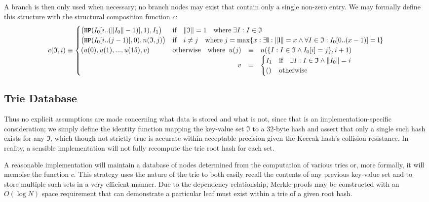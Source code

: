\documentclass[9pt,oneside]{amsart}
\begin{document}
A branch is then only used when necessary; no branch nodes may exist that contain only a single non-zero entry. We may formally define this structure with the structural composition function $c$:
\begin{equation}
c(\mathfrak{I}, i) \equiv \begin{cases}
 \big(\texttt{HP}(I_0[i .. (\lVert I_0\rVert - 1)], 1), I_1 \big) & \text{if} \quad \lVert \mathfrak{I} \rVert = 1 \quad \text{where} \; \exists I: I \in \mathfrak{I} \\
\big(\texttt{HP}(I_0[i .. (j - 1)], 0), n(\mathfrak{I}, j) \big) & \text{if} \quad i \ne j \quad \text{where} \; j = \max \{ x : \exists \mathbf{l}: \lVert \mathbf{l} \rVert = x \wedge \forall I \in \mathfrak{I}: I_0[0 .. (x - 1)] = \mathbf{l} \} \\
(u(0), u(1), ..., u(15), v) & \text{otherwise} \quad \text{where} \begin{array}[t]{rcl}
u(j) & \equiv & n(\{ I : I \in \mathfrak{I} \wedge I_0[i] = j \}, i + 1) \\
v & = & \begin{cases}
I_1 & \text{if} \quad \exists I: I \in \mathfrak{I} \wedge \lVert I_0 \rVert = i \\
() & \text{otherwise}
\end{cases}
\end{array}
\end{cases}
\end{equation}

\subsection{Trie Database}
Thus no explicit assumptions are made concerning what data is stored and what is not, since that is an implementation-specific consideration; we simply define the identity function mapping the key-value set $\mathfrak{I}$ to a 32-byte hash and assert that only a single such hash exists for any $\mathfrak{I}$, which though not strictly true is accurate within acceptable precision given the Keccak hash's collision resistance. In reality, a sensible implementation will not fully recompute the trie root hash for each set.

A reasonable implementation will maintain a database of nodes determined from the computation of various tries or, more formally, it will memoise the function $c$. This strategy uses the nature of the trie to both easily recall the contents of any previous key-value set and to store multiple such sets in a very efficient manner. Due to the dependency relationship, Merkle-proofs may be constructed with an $O(\log N)$ space requirement that can demonstrate a particular leaf must exist within a trie of a given root hash.
\end{document}
